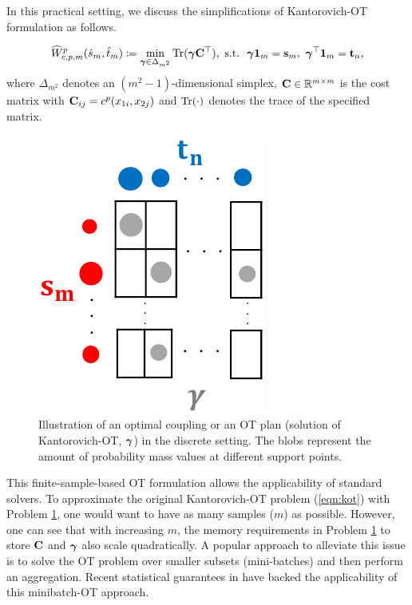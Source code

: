 In this practical setting, we discuss the simplifications of Kantorovich-OT formulation as follows.
\begin{definition}
\begin{equation}\label{eqn:discretekot}
\widehat{W}^p_{c, p, m}(\hat{s}_m,\hat{t}_m)\coloneqq \min\limits_{\bm{\gamma}\in \Delta_{m^2}}\textup{Tr}(\bm{\gamma} \mathbf{C}^\top), \textup{ s.t.}\ \ \bm{\gamma} \mathbf{1}_m=\mathbf{s}_m,\ \bm{\gamma}^\top \mathbf{1}_m=\mathbf{t}_n,
\end{equation}
where $\Delta_{m^2}$ denotes an $(m^2-1)$-dimensional simplex, $\mathbf{C}\in \mathbb{R}^{m\times m}$ is the cost matrix with $\mathbf{C}_{ij}=c^p(x_{1i}, x_{2j})$ and $\textup{Tr}(\cdot)$ denotes the trace of the specified matrix.
\end{definition}
\begin{figure}[t]
    \centering
    \includegraphics[scale=0.5]{background/images/discOT.pdf}
    \caption[Illustration of an optimal coupling or an OT plan (solution of Kantorovich-OT) in the discrete setting.]{Illustration of an optimal coupling or an OT plan (solution of Kantorovich-OT, $\bm{\gamma}$) in the discrete setting. The blobs represent the amount of probability mass values at different support points.}
    \label{discOT}
\end{figure}

This finite-sample-based OT formulation allows the applicability of standard solvers. To approximate the original Kantorovich-OT problem (\ref{eqn:kot}) with Problem \ref{discOT}, one would want to have as many samples ($m$) as possible. However, one can see that with increasing $m$, the memory requirements in Problem \ref{discOT} to store $\mathbf{C}$ and $\bm{\gamma}$ also scale quadratically.
 A popular approach to alleviate this issue is to solve the OT problem over smaller subsets (mini-batches) and then perform an aggregation. Recent statistical guarantees in \cite{fatras2019learnwass,jumbot} have backed the applicability of this minibatch-OT approach.

